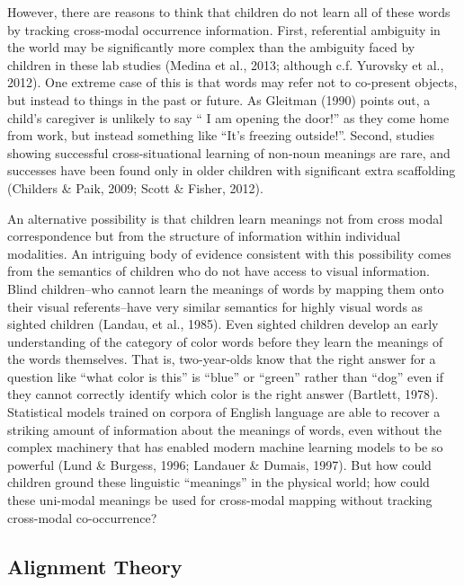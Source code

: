 \documentclass[10pt, letterpaper]{article}
\begin{document}
However, there are reasons to think that children do not learn all of
these words by tracking cross-modal occurrence information. First,
referential ambiguity in the world may be significantly more complex
than the ambiguity faced by children in these lab studies (Medina et
al., 2013; although c.f. Yurovsky et al., 2012). One extreme case of
this is that words may refer not to co-present objects, but instead to
things in the past or future. As Gleitman (1990) points out, a child's
caregiver is unlikely to say `` I am opening the door!'' as they come
home from work, but instead something like ``It's freezing outside!''.
Second, studies showing successful cross-situational learning of
non-noun meanings are rare, and successes have been found only in older
children with significant extra scaffolding (Childers \& Paik, 2009;
Scott \& Fisher, 2012).

An alternative possibility is that children learn meanings not from
cross modal correspondence but from the structure of information within
individual modalities. An intriguing body of evidence consistent with
this possibility comes from the semantics of children who do not have
access to visual information. Blind children--who cannot learn the
meanings of words by mapping them onto their visual referents--have very
similar semantics for highly visual words as sighted children (Landau,
et al., 1985). Even sighted children develop an early understanding of
the category of color words before they learn the meanings of the words
themselves. That is, two-year-olds know that the right answer for a
question like ``what color is this'' is ``blue'' or ``green'' rather
than ``dog'' even if they cannot correctly identify which color is the
right answer (Bartlett, 1978). Statistical models trained on corpora of
English language are able to recover a striking amount of information
about the meanings of words, even without the complex machinery that has
enabled modern machine learning models to be so powerful (Lund \&
Burgess, 1996; Landauer \& Dumais, 1997). But how could children ground
these linguistic ``meanings'' in the physical world; how could these
uni-modal meanings be used for cross-modal mapping without tracking
cross-modal co-occurrence?

\hypertarget{alignment-theory}{%
\subsection{Alignment Theory}\label{alignment-theory}}
\end{document}
